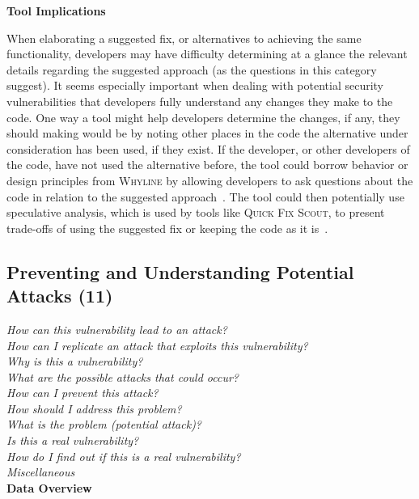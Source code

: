 \documentclass[conference]{IEEEtran}
\begin{document}
\noindent\textbf{Tool Implications}

When elaborating a suggested fix, or alternatives to achieving the same functionality, developers may have difficulty determining at a glance the relevant details regarding the suggested approach (as the questions in this category suggest).
It seems especially important when dealing with potential security vulnerabilities that developers fully understand any changes they make to the code.
One way a tool might help developers determine the changes, if any, they should making would be by noting other places in the code the alternative under  consideration has been used, if they exist. 
If the developer, or other developers of the code, have not used the alternative before, the tool could borrow behavior or design principles from \textsc{Whyline} by allowing developers to ask questions about the code in relation to the suggested approach~\cite{ko2004designing}. 
The tool could then potentially use speculative analysis, which is used by tools like \textsc{Quick Fix Scout}, to present trade-offs of using the suggested fix or keeping the code as it is~\cite{mucslu2012speculative}.



\noindent\subsection{\textbf{Preventing and Understanding Potential Attacks (11)}}\label{pupa}

\noindent\emph{How can this vulnerability lead to an attack?} \\
\emph{How can I replicate an attack that exploits this vulnerability?} \\
\emph{Why is this a vulnerability?} \\
\emph{What are the possible attacks that could occur?} \\
\emph{How can I prevent this attack?} \\
\emph{How should I address this problem? } \\
\emph{What is the problem (potential attack)?} \\
\emph{Is this a real vulnerability?} \\
\emph{How do I find out if this is a real vulnerability?} \\
\emph{Miscellaneous} \\

\noindent\textbf{Data Overview}
\end{document}
